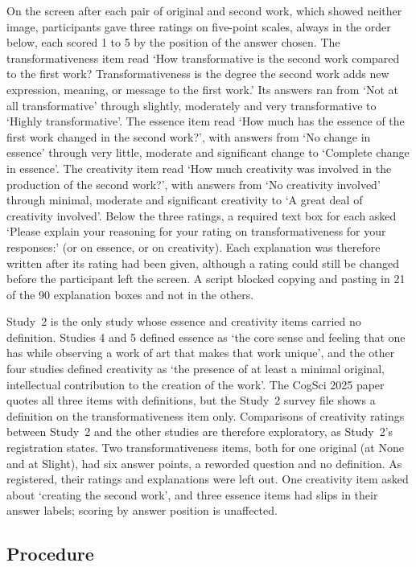 On the screen after each pair of original and second work, which showed neither image, participants gave three ratings on five-point scales, always in the order below, each scored 1 to 5 by the position of the answer chosen. The transformativeness item read `How transformative is the second work compared to the first work? Transformativeness is the degree the second work adds new expression, meaning, or message to the first work.' Its answers ran from `Not at all transformative' through slightly, moderately and very transformative to `Highly transformative'. The essence item read `How much has the essence of the first work changed in the second work?', with answers from `No change in essence' through very little, moderate and significant change to `Complete change in essence'. The creativity item read `How much creativity was involved in the production of the second work?', with answers from `No creativity involved' through minimal, moderate and significant creativity to `A great deal of creativity involved'. Below the three ratings, a required text box for each asked `Please explain your reasoning for your rating on transformativeness for your responses:' (or on essence, or on creativity). Each explanation was therefore written after its rating had been given, although a rating could still be changed before the participant left the screen. A script blocked copying and pasting in 21 of the 90 explanation boxes and not in the others.

Study~2 is the only study whose essence and creativity items carried no definition. Studies 4 and 5 defined essence as `the core sense and feeling that one has while observing a work of art that makes that work unique', and the other four studies defined creativity as `the presence of at least a minimal original, intellectual contribution to the creation of the work'. The CogSci 2025 paper quotes all three items with definitions, but the Study~2 survey file shows a definition on the transformativeness item only. Comparisons of creativity ratings between Study~2 and the other studies are therefore exploratory, as Study~2's registration states. Two transformativeness items, both for one original (at None and at Slight), had six answer points, a reworded question and no definition. As registered, their \STwoNSixPointDropped{} ratings and explanations were left out. One creativity item asked about `creating the second work', and three essence items had slips in their answer labels; scoring by answer position is unaffected.

\subsection*{Procedure}

